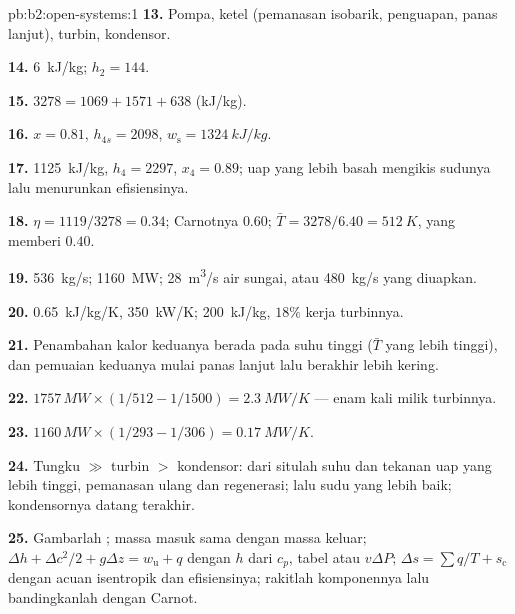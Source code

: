 \begin{solution}{pb:b2:open-systems:1}
\textbf{13.} Pompa, ketel (pemanasan isobarik, penguapan, panas lanjut),
turbin, kondensor.

\textbf{14.} \qty{6}{kJ/kg}; $h_2 = 144$.

\textbf{15.} $3278 = 1069 + 1571 + 638$ (\unit{kJ/kg}).

\textbf{16.} $x = 0.81$, $h_{4s} = 2098$, $w_{\text{s}} = \qty{1324}{kJ/kg}$.

\textbf{17.} \qty{1125}{kJ/kg}, $h_4 = 2297$, $x_4 = 0.89$; uap yang lebih basah mengikis
sudunya lalu menurunkan efisiensinya.

\textbf{18.} $\eta = 1119/3278 = 0.34$; Carnotnya $0.60$; $\bar T = 3278/6.40 =
\qty{512}{K}$, yang memberi $0.40$.

\textbf{19.} \qty{536}{kg/s}; \qty{1160}{MW}; \qty{28}{m^3/s} air sungai,
atau \qty{480}{kg/s} yang diuapkan.

\textbf{20.} \qty{0.65}{kJ/kg/K}, \qty{350}{kW/K}; \qty{200}{kJ/kg}, $18\%$ kerja
turbinnya.

\textbf{21.} Penambahan kalor keduanya berada pada suhu tinggi ($\bar T$ yang lebih
tinggi), dan pemuaian keduanya mulai panas lanjut lalu berakhir lebih kering.

\textbf{22.} $1757\,\unit{MW} \times (1/512 - 1/1500) = \qty{2.3}{MW/K}$ --- enam kali
milik turbinnya.

\textbf{23.} $1160\,\unit{MW} \times (1/293 - 1/306) = \qty{0.17}{MW/K}$.

\textbf{24.} Tungku $\gg$ turbin $>$ kondensor: dari situlah suhu dan tekanan
uap yang lebih tinggi, pemanasan ulang dan regenerasi; lalu sudu yang lebih baik;
kondensornya datang terakhir.

\textbf{25.} Gambarlah ; massa masuk sama dengan massa keluar; $\Delta h +
\Delta c^2/2 + g\Delta z = w_{\text{u}} + q$ dengan $h$ dari $c_p$, tabel atau
$v\Delta P$; $\Delta s = \sum q/T + s_{\text{c}}$ dengan acuan isentropik dan
efisiensinya; rakitlah komponennya lalu bandingkanlah dengan Carnot.
\end{solution}
